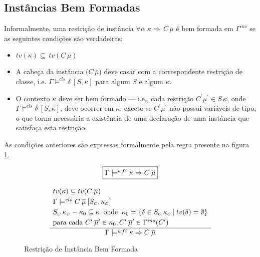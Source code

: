 \subsection{Inst\^ancias Bem Formadas}\label{wellformedinst}

Informalmente, uma restri\c{c}\~ao de inst\^ancia $\forall\overline{\alpha}.\kappa\Rightarrow\,C\,\overline{\mu}$ 
\'e bem formada em $\Gamma^{ins}$ se as seguintes condi\c{c}\~oes s\~ao verdadeiras:
\begin{itemize}
	\item $tv(\kappa)\subseteq\, tv(C\,\overline{\mu})$
	\item A cabe\c{c}a da inst\^ancia ($C\,\overline{\mu}$) deve casar com a correspondente restri\c{c}\~ao de classe,
	      i.e. $\Gamma \models^{cls} \delta\:[S,\kappa]$ para algum $S$ e algum $\kappa$.	      
	\item O contexto $\kappa$ deve ser bem formado --- i.e., cada restri\c{c}\~ao 
	      $C^{\prime}\overline{\mu}^{\prime}\in S\,\kappa$, onde 
	       $\Gamma \models^{cls} \delta\:[S,\kappa]$, deve ocorrer em
	      $\kappa$, exceto se $C^{\prime}\overline{\mu}^{\prime}$ n\~ao possui vari\'aveis de tipo, o que torna 
	      necess\'aria a exist\^encia de uma declara\c{c}\~ao de uma inst\^ancia que satisfa\c{c}a esta restri\c{c}\~ao. 
\end{itemize}
As condi\c{c}\~oes anteriores s\~ao expressas formalmente pela regra presente na figura 
\ref{figwellformedinst}.

\begin{figure}[h]
\small{
\[ \begin{array}{c} 
    \fbox{$\Gamma \models^{wfi} \kappa\Rightarrow C\:\overline{\mu}$} \\ [.5cm]
    \begin{array}{c}
	  {\displaystyle \frac{\begin{array}{l}
	                        tv(\kappa) \subseteq tv(C\:\overline{\mu}) \\ [.1cm]
					        \Gamma \models^{cls} C\:\overline{\mu}\:[S_{\scriptscriptstyle{C}},\kappa_{\scriptscriptstyle{C}}] \\ [.1cm]
	                        S_{\scriptscriptstyle{C}}\,\kappa_{\scriptscriptstyle{C}} - \kappa_0 \subseteq \kappa\: 
					        \text{ onde } \:
					        \kappa_0 = \{\delta \in S_{\scriptscriptstyle{C}}\,\kappa_{\scriptscriptstyle{C}}\:|\: tv(\delta)=\emptyset \} \\ [.1cm]
					        \text{para cada } C'\:\overline{\mu}' \in \kappa_0, C'\:\overline{\mu}' \in \Gamma^{ins}(C')
					       \end{array}}
		                 {\Gamma \models^{wfi} \kappa\Rightarrow C\:\overline{\mu}}}
	 
    \end{array}
   \end{array}
\] }
\caption{Restri\c{c}\~ao de Inst\^ancia Bem Formada}
\label{figwellformedinst}
\end{figure}

